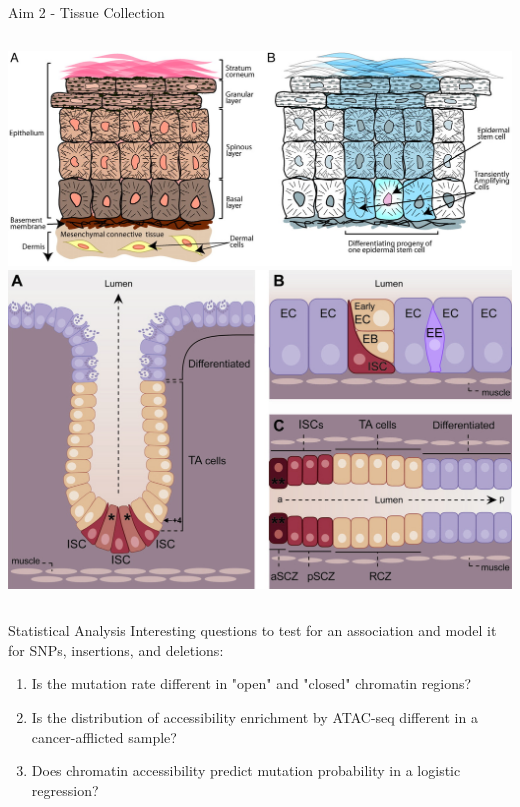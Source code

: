 \documentclass{beamer}
\begin{document}
\begin{frame}{Aim 2 - Tissue Collection}
\begin{columns}
\includegraphics[width=\linewidth,trim={0 0 22cm 0},clip]{alonso_2003_skin.jpg}
\includegraphics[width=\linewidth,trim={0 0 4.2cm 0},clip]{casali_2009_intestine.jpg}
\end{columns}
\end{frame}

\begin{frame}{Statistical Analysis}
Interesting questions to test for an association and model it for SNPs, insertions, and deletions:
\begin{enumerate}
	\item Is the mutation rate different in "open" and "closed" chromatin regions?
	\item Is the distribution of accessibility enrichment by ATAC-seq different in a cancer-afflicted sample?
	\item Does chromatin accessibility predict mutation probability in a logistic regression?
\end{enumerate}
\end{frame}
\end{document}
